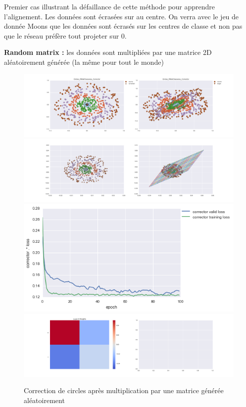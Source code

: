 Premier cas illustrant la défaillance de cette méthode pour apprendre l'alignement. 
Les données sont écrasées sur au centre. On verra avec le jeu de donnée Moons que les 
données sont écrasés sur les centres de classe et non pas que le réseau préfère tout projeter sur 0.


{\Large \textbf{Random matrix :}} les données sont multipliées par une matrice 2D aléatoirement générée
 (la même pour tout le monde)

\begin{figure}[H] %
\centering
\includegraphics[width=\linewidth]{fig/24-05-2016/circles/Circles_RMatClasswise_Corrector-DATA.png}
\includegraphics[width=\linewidth]{fig/24-05-2016/circles/Circles_RMatClasswise_Corrector-GridCheck.png}
\includegraphics[width=0.45\linewidth]{fig/24-05-2016/circles/Circles_RMatClasswise_Corrector-Learning_curve.png}
\includegraphics[width=\linewidth]{fig/24-05-2016/circles/Circles_RMatClasswise_Corrector-W.png}
\caption{Correction de circles après multiplication par une matrice générée aléatoirement}
\label{fig:recap-circles-RMat-classwise}
\end{figure}

